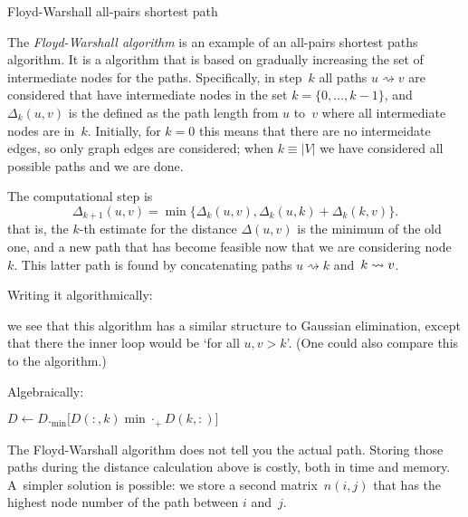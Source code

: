  {Floyd-Warshall all-pairs shortest path}
\label{sec:floyd}

The \emph{Floyd-Warshall algorithm} is an example of an all-pairs
shortest paths algorithm. It is a 
algorithm that is based on gradually increasing the set of intermediate
nodes for the paths.
Specifically,  in step~$k$ all paths $u\rightsquigarrow v$ are considered 
that have intermediate nodes in the set $k=\{0,\ldots,k-1\}$, and $\Delta_k(u,v)$ 
is the defined as the path length from $u$ to~$v$ where all intermediate nodes
are in~$k$.
Initially, for $k=0$ this means that there are no intermeidate edges,
so only graph edges are considered;
when $k\equiv |V|$ we have considered all possible paths and we are done.

The computational step is
\begin{equation}
  \Delta_{k+1}(u,v) = \min\bigl\{ \Delta_k(u,v),
  \Delta_k(u,k)+\Delta_k(k,v) \bigr\}.
  \label{eq:floyd-allpairs}
\end{equation}
that is, the $k$-th estimate for the distance $\Delta(u,v)$ is the minimum
of the old one, and a new path that has become feasible now that we
are considering node~$k$. This latter path is found by
concatenating paths $u\rightsquigarrow k$
and~$k\rightsquigarrow\nobreak v$.

Writing it algorithmically:
\begin{displayalgorithm}
\end{displayalgorithm}
we see that this algorithm has a similar structure to Gaussian elimination, 
except that there the inner loop would be `for all $u,v>k$'.
(One could also compare this to the  algorithm.)

Algebraically:
\begin{displayalgorithm}
   {
    $D\leftarrow D._{\min} \bigl[D(:,k) \mathbin{\min\cdot_+} D(k,:)  \bigr]$
  }
\end{displayalgorithm}

The Floyd-Warshall algorithm does not tell you the actual
path. Storing those paths during the distance calculation above is
costly, both in time and memory. A~simpler solution is possible: we
store a second matrix~$n(i,j)$ that has the highest node number of the
path between $i$ and~$j$.

